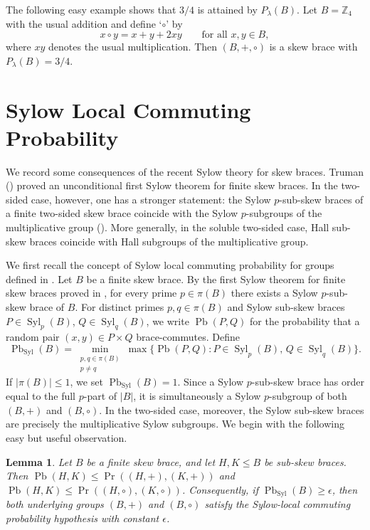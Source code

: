 \documentclass[10pt,a4paper]{amsart}
\numberwithin{equation}{section}
\newtheorem{lem}[equation]{Lemma}
\newcommand{\Pb}{\operatorname{Pb} }
\renewcommand{\Pr}{\operatorname{Pr} }
\newcommand{\Syl}{\operatorname{Syl} }
\begin{document}
The following easy example shows that $3/4$ is attained by
$P_{\lambda}(B)$. Let $B=\mathbb{Z}_4$ with the usual addition and define
`$\circ$' by
$$
x\circ y=x+y+2xy
\qquad\mbox{for all }x,y\in B,
$$
where $xy$ denotes the usual multiplication. Then $(B,+,\circ)$ is a
skew brace with
$P_{\lambda}(B)=3/4$.






\section{Sylow Local Commuting Probability}

We record some consequences of the recent Sylow theory for skew braces.
Truman (\cite{Tru26}) proved an unconditional first Sylow theorem for finite skew braces. In the two-sided case, however, one has a stronger statement:
 the Sylow $p$-sub-skew braces of a finite
two-sided skew brace coincide with the Sylow $p$-subgroups of the
multiplicative group (\cite[Theorem 14]{CDMFT26}). More generally, in the soluble two-sided case, Hall sub-skew braces coincide with Hall subgroups of the multiplicative group.

We first recall the concept of Sylow local commuting probability for groups defined in \cite{DLMS25}. Let $B$ be a finite skew brace. By the first Sylow theorem for finite skew braces proved in \cite{Tru26}, for every prime $p\in\pi(B)$ there exists a Sylow $p$-sub-skew brace of $B$. For distinct primes
$p,q\in\pi(B)$ and Sylow sub-skew braces $P\in\Syl_p(B)$,
$Q\in\Syl_q(B)$, we write $\Pb(P,Q)$ for the probability that a random
pair $(x,y)\in P\times Q$ brace-commutes. Define
\[
\Pb_{\Syl}(B)=
\min_{\substack{p,q\in\pi(B)\\p\neq q}}
\max\{\Pb(P,Q):P\in\Syl_p(B),\,Q\in\Syl_q(B)\}.
\]
If $|\pi(B)|\leqslant 1$, we set $\Pb_{\Syl}(B)=1$. Since a Sylow $p$-sub-skew brace has order equal to the full $p$-part of $|B|$, it is simultaneously a Sylow $p$-subgroup of both $(B,+)$ and $(B,\circ)$. In the two-sided case, moreover, the Sylow sub-skew braces are precisely the multiplicative Sylow subgroups. We begin with the following easy but useful observation.

\begin{lem}\label{lem:sylow-brace-prob-to-groups}
Let $B$ be a finite skew brace, and let $H,K\leqslant B$ be sub-skew braces.
Then
$\Pb(H,K)\leqslant \Pr((H,+),(K,+))$ and
$\Pb(H,K)\leqslant \Pr((H,\circ),(K,\circ))$.
Consequently, if $\Pb_{\Syl}(B)\geqslant\epsilon$, then
both underlying groups $(B,+)$ and $(B,\circ)$ satisfy the Sylow-local
commuting probability hypothesis with constant $\epsilon$.
\end{lem}
\end{document}
